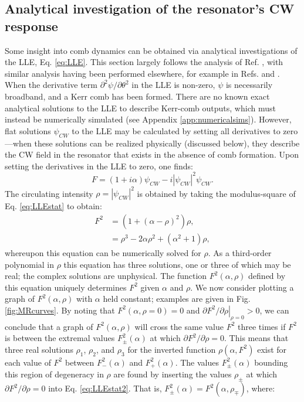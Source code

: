 \subsection{Analytical investigation of the resonator's CW response}\label{sec:MRanalyticalcurves}
Some insight into comb dynamics can be obtained via analytical investigations of the LLE, Eq. \ref{eq:LLE}. This section largely follows the analysis of Ref. , with similar analysis having been performed elsewhere, for example in Refs. \cite{Coen2013a} and \cite{Barashenkov1996}. When the derivative term $\partial^2\psi/\partial\theta^2$ in the LLE is non-zero, $\psi$ is necessarily broadband, and a Kerr comb has been formed. There are no known exact analytical solutions to the LLE to describe Kerr-comb outputs, which must instead be numerically simulated (see Appendix \ref{app:numericalsims}). However, flat solutions $\psi_{CW}$ to the LLE may be calculated by setting all derivatives to zero---when these solutions can be realized physically (discussed below), they describe the CW field in the resonator that exists in the absence of comb formation. Upon setting the derivatives in the LLE to zero, one finds:
\begin{equation}
F=(1+i\alpha)\psi_{CW}-i|\psi_{CW}|^2\psi_{CW}. \label{eq:LLEstat}
\end{equation}
The circulating intensity $\rho=|\psi_{CW}|^2$ is obtained by taking the modulus-square of Eq. \ref{eq:LLEstat} to obtain:
\begin{align}
F^2&=\left(1+(\alpha-\rho)^2\right)\rho\label{eq:LLEstat2},\\
&=\rho^3-2\alpha\rho^2+(\alpha^2+1)\rho,
\end{align} 
whereupon this equation can be numerically solved for $\rho$. As a third-order polynomial in $\rho$ this equation has three solutions, one or three of which may be real; the complex solutions are unphysical. The function $F^2(\alpha,\rho)$ defined by this equation uniquely determines $F^2$ given $\alpha$ and $\rho$. We now consider plotting a graph of $F^2(\alpha,\rho)$ with $\alpha$ held constant; examples are given in Fig. \ref{fig:MRcurves}. By noting that $F^2(\alpha,\rho=0)=0$ and $\left.\partial F^2/\partial \rho\right|_{\rho=0}>0$, we can conclude that a graph of $F^2(\alpha,\rho)$ will cross the same value $F^2$ three times if $F^2$ is between the extremal values $F^2_\pm(\alpha)$ at which $\partial F^2/\partial\rho=0$. This means that three real solutions $\rho_1$, $\rho_2$, and $\rho_3$ for the inverted function $\rho(\alpha,F^2)$ exist for each value of $F^2$ between $F^2_-(\alpha)$ and $F^2_+(\alpha)$. The values $F^2_\pm(\alpha)$ bounding  this region of degeneracy in $\rho$ are found by inserting the values $\rho_\pm$ at which $\partial F^2/\partial\rho=0$ into Eq. \ref{eq:LLEstat2}. That is, $F^2_\pm(\alpha)=F^2(\alpha,\rho_\mp)$, where:
